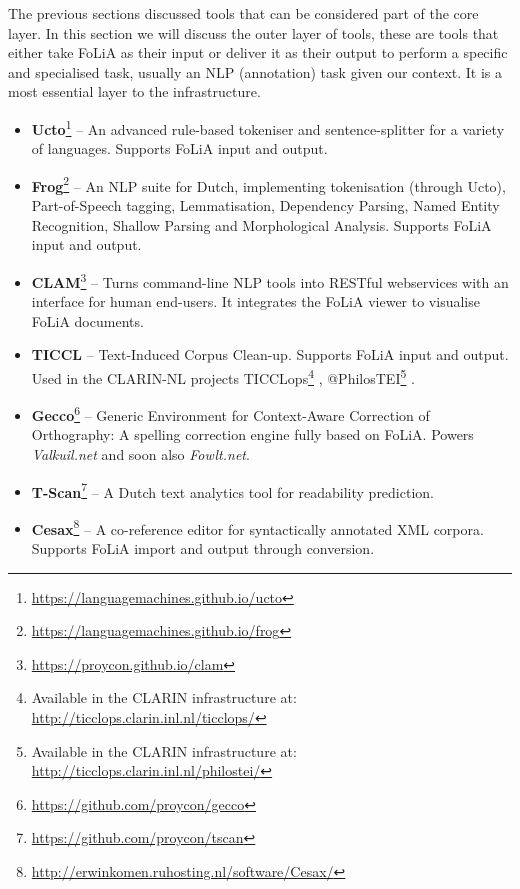 \documentclass[a4paper,11pt]{article}
\begin{document}
The previous sections discussed tools that can be considered part of the
core layer. In this section we will discuss the outer layer of tools, these are
tools that either take FoLiA as their input or deliver it as their output to
perform a specific and specialised task, usually an NLP (annotation) task given our context.
It is a most essential layer to the infrastructure.

\begin{itemize}
\item \textbf{\textbf{Ucto}}\footnote{\url{https://languagemachines.github.io/ucto}} -- An advanced rule-based tokeniser and sentence-splitter for a variety of
    languages. Supports FoLiA
    input and output. \cite{UCTO}
\item \textbf{\textbf{Frog}}\footnote{\url{https://languagemachines.github.io/frog}} -- An NLP suite for Dutch, implementing tokenisation (through
    Ucto), Part-of-Speech tagging, Lemmatisation, Dependency Parsing, Named
    Entity Recognition, Shallow Parsing and Morphological Analysis. Supports
    FoLiA input and output.
\item \textbf{\textbf{CLAM}}\footnote{\url{https://proycon.github.io/clam}} -- Turns command-line NLP tools into RESTful webservices with an
    interface for human end-users. It integrates the FoLiA viewer to visualise
    FoLiA documents. \cite{CLAM}
\item \textbf{\textbf{TICCL}} -- Text-Induced Corpus Clean-up. Supports FoLiA
    input and output. Used in the
    CLARIN-NL projects TICCLops\footnote{Available in the CLARIN infrastructure at: \url{http://ticclops.clarin.inl.nl/ticclops/}} \cite{Reynaert2010}, @PhilosTEI\footnote{Available in the CLARIN infrastructure at: \url{http://ticclops.clarin.inl.nl/philostei/}} \cite{Reynaert2014b}. 
\item \textbf{\textbf{Gecco}}\footnote{\url{https://github.com/proycon/gecco}}  -- Generic Environment for Context-Aware Correction
    of Orthography: A spelling correction engine fully based on FoLiA. Powers
    \emph{Valkuil.net} and soon also \emph{Fowlt.net}.
\item \textbf{\textbf{T-Scan}}\footnote{\url{https://github.com/proycon/tscan}} -- A Dutch text analytics tool for readability
    prediction. \cite{TSCAN}
\item \textbf{\textbf{Cesax}}\footnote{\url{http://erwinkomen.ruhosting.nl/software/Cesax/}} -- A co-reference editor for syntactically annotated XML corpora.
    Supports FoLiA import and output through conversion. 

\end{itemize}
\end{document}
